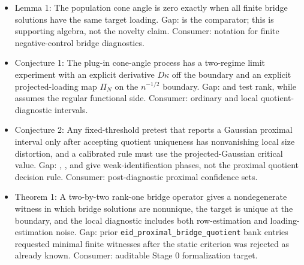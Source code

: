\documentclass[11pt]{article}
\theoremstyle{definition}
\theoremstyle{plain}
\theoremstyle{remark}
\begin{document}
\begin{itemize}[leftmargin=*]
\item Lemma 1: The population cone angle is zero exactly when all finite bridge solutions have the same target loading. Gap: \citet{zhang2023proximalWithoutUniqueness} is the comparator; this is supporting algebra, not the novelty claim. Consumer: notation for finite negative-control bridge diagnostics.
\item Conjecture 1: The plug-in cone-angle process has a two-regime limit experiment with an explicit derivative \(D\kappa\) off the boundary and an explicit projected-loading map \(\Pi_N\) on the \(n^{-1/2}\) boundary. Gap: \citet{kleibergenPaap2006generalizedReducedRank} and \citet{robinSmith2000TestsRank} test rank, while \citet{bennett2023stronglyIdentifiedFunctionals} assumes the regular functional side. Consumer: ordinary and local quotient-diagnostic intervals.
\item Conjecture 2: Any fixed-threshold pretest that reports a Gaussian proximal interval only after accepting quotient uniqueness has nonvanishing local size distortion, and a calibrated rule must use the projected-Gaussian critical value. Gap: \citet{andrewsCheng2012weakSemiStrongStrong}, \citet{andrewsCheng2014gmmIdentificationFailure}, and \citet{hanMcCloskey2019nearlySingularJacobian} give weak-identification phases, not the proximal quotient decision rule. Consumer: post-diagnostic proximal confidence sets.
\item Theorem 1: A two-by-two rank-one bridge operator gives a nondegenerate witness in which bridge solutions are nonunique, the target is unique at the boundary, and the local diagnostic includes both row-estimation and loading-estimation noise. Gap: prior \texttt{eid\_proximal\_bridge\_quotient} bank entries requested minimal finite witnesses after the static criterion was rejected as already known. Consumer: auditable Stage 0 formalization target.
\end{itemize}
\end{document}
